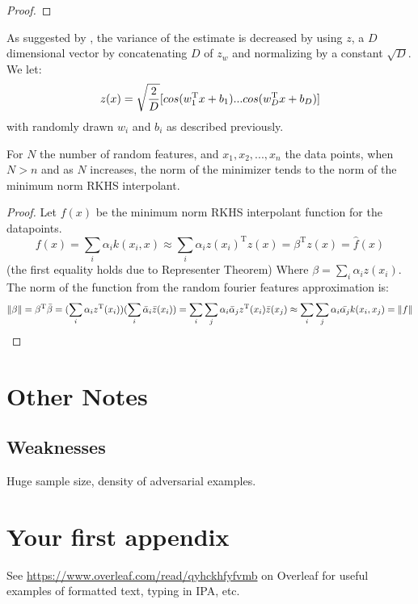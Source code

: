 \documentclass[twoside]{memoir}
\begin{document}
\begin{proof}
\end{proof}
As suggested by \cite{RFF_Rahimi}, the variance of the estimate is decreased by using $z$, a $D$ dimensional vector by concatenating $D$ of $z_w$ and normalizing by a constant $\sqrt{D}$. We let:
\[z(x) = \sqrt{\frac{2}{D}} [cos(w_1^{\text{T}}x + b_1) ... cos(w_D^{\text{T}}x + b_D)] \]
with randomly drawn $w_i$ and $b_i$ as described previously.


\begin{thm} \label{thm:RFFnorm}
	For $N$ the number of random features, and $x_1, x_2, ..., x_n$ the data points, when $N > n$ and as $N$ increases, the norm of the minimizer tends to  the norm of the minimum norm RKHS interpolant.
\end{thm}
\begin{proof}
	Let $f(x)$ be the minimum norm RKHS interpolant function for the datapoints. 
	\[f(x) = \sum_{i}\alpha_ik(x_i, x) \approx \sum_{i}\alpha_iz(x_i)^\text{T}z(x) 
	= \beta^\text{T}z(x) = \hat{f}(x)
	\] (the first equality holds due to Representer Theorem)
	Where $\beta = \sum_{i}\alpha_iz(x_i) $.
	The norm of the function from the random fourier features approximation is:
	\[ \lVert\beta\rVert =   \beta^\text{T} \bar{\beta} = 
	(\sum_{i}\alpha_i z^\text{T}(x_i)) (\sum_{i}\bar{\alpha}_i\bar{z}(x_i)) 
	= \sum_i \sum_j \alpha_i \bar{\alpha}_j z^\text{T}(x_i)\bar{z}(x_j)  
	\approx \sum_i \sum_j \alpha_i \bar{ \alpha_j} k(x_i, x_j)
	= \lVert f\rVert
	\]
\end{proof}

\chapter{Other Notes}
\section{Weaknesses}
Huge sample size, density of adversarial examples.

\appendix
\chapter{Your first appendix}


See \url{https://www.overleaf.com/read/qyhckhfyfvmb} on Overleaf for useful examples of formatted text, typing in IPA, etc.

\backmatter


\end{document}
